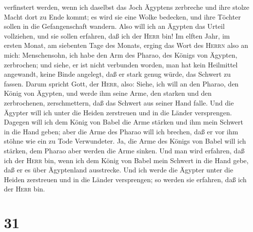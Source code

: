 verfinstert werden, wenn ich daselbst das Joch Ägyptens zerbreche und
ihre stolze Macht dort zu Ende kommt; es wird sie eine Wolke bedecken,
und ihre Töchter sollen in die Gefangenschaft wandern. 
Also will ich an Ägypten das Urteil vollziehen, und sie sollen erfahren,
daß ich der \textsc{Herr} bin!  Im elften Jahr, im ersten
Monat, am siebenten Tage des Monats, erging das Wort des \textsc{Herrn}
also an mich:  Menschensohn, ich habe den Arm des Pharao,
des Königs von Ägypten, zerbrochen; und siehe, er ist nicht verbunden
worden, man hat kein Heilmittel angewandt, keine Binde angelegt, daß er
stark genug würde, das Schwert zu fassen.  Darum spricht
Gott, der \textsc{Herr}, also: Siehe, ich will an den Pharao, den König
von Ägypten, und werde ihm seine Arme, den starken und den zerbrochenen,
zerschmettern, daß das Schwert aus seiner Hand falle. 
Und die Ägypter will ich unter die Heiden zerstreuen und in die Länder
versprengen.  Dagegen will ich dem König von Babel die
Arme stärken und ihm mein Schwert in die Hand geben; aber die Arme des
Pharao will ich brechen, daß er vor ihm stöhne wie ein zu Tode
Verwundeter.  Ja, die Arme des Königs von Babel will ich
stärken, dem Pharao aber werden die Arme sinken. Und man wird erfahren,
daß ich der \textsc{Herr} bin, wenn ich dem König von Babel mein Schwert
in die Hand gebe, daß er es über Ägyptenland ausstrecke. 
Und ich werde die Ägypter unter die Heiden zerstreuen und in die Länder
versprengen; so werden sie erfahren, daß ich der \textsc{Herr} bin.

\hypertarget{section-30}{%
\section{31}\label{section-30}}


